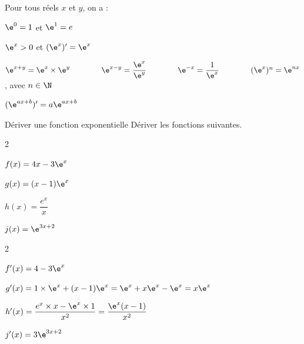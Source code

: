         \begin{bprops}
            Pour tous réels $x$ et $y$, on a :
            \begin{enumDef}
                \item $\e^0=1$ et $\e^1=e$
                \item $\e^x>0$ et $(\e^x)'=\e^x$
                \item $\e^{x+y}=\e^x\times\e^y\ \ \ \ \ \ \ \ \ \ \ \ \e^{x-y}=\dfrac{\e^x}{\e^y}\ \ \ \ \ \ \ \ \ \ \ \ \e^{-x}=\dfrac{1}{\e^{x}}\ \ \ \ \ \ \ \ \ \ \ \ (\e^x)^n=\e^{nx}$, avec $n \in \N$
                \item $(\e^{ax+b})'=a\e^{ax+b}$
            \end{enumDef}
        \end{bprops}
        \begin{bmethodet}{Dériver une fonction exponentielle}
             Dériver les fonctions suivantes.
            \begin{enumMet}
                \begin{multicols}{2}
                    \item $f(x)=4x-3\e^x$
                    \item $g(x)=(x-1)\e^x$
                    \item $h(x)=\dfrac{e^x}{x}$
                    \item $j(x)=\e^{3x+2}$
                \end{multicols}
            \end{enumMet}
            \begin{enumMet}
                \begin{multicols}{2}
                    \item $f'(x)=4-3\e^x$
                    \item $g'(x)=1\times \e^x + (x-1)\e^x=\e^x+x\e^x-\e^x=x\e^x$
                    \item $h'(x)=\dfrac{e^x\times x-\e^x\times 1}{x^2}=\dfrac{\e^x(x-1)}{x^2}$
                    \item $j'(x)=3\e^{3x+2}$
                \end{multicols}
            \end{enumMet}
        \end{bmethodet}
